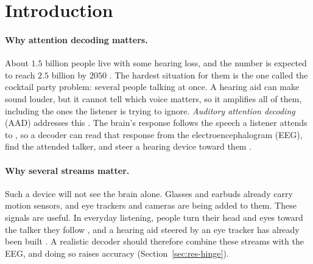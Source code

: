 \section{Introduction}
\label{sec:intro}

\paragraph{Why attention decoding matters.}
About $1.5$ billion people live with some hearing loss, and the number is
expected to reach $2.5$ billion by $2050$ \citep{who2021hearing}. The hardest
situation for them is the one \citet{cherry1953} called the cocktail party
problem: several people talking at once. A hearing aid can make sound louder, but
it cannot tell which voice matters, so it amplifies all of them, including the
ones the listener is trying to ignore. \emph{Auditory attention decoding} (AAD)
addresses this \citep{osullivan2015,geirnaert2021}. The brain's response follows
the speech a listener attends to \citep{ding2012,lalor2009}, so a decoder can
read that response from the electroencephalogram (EEG), find the attended
talker, and steer a hearing device toward them \citep{pan2024neuroheed}.

\paragraph{Why several streams matter.}
Such a device will not see the brain alone. Glasses and earbuds already carry
motion sensors, and eye trackers and cameras are being added to them. These
signals are useful. In everyday listening, people turn their head and eyes toward
the talker they follow \citep{hendrikse2019,best2023gaze,kidd2005}, and a hearing
aid steered by an eye tracker has already been built \citep{kidd2013visually}. A
realistic decoder should therefore combine these streams with the EEG, and doing
so raises accuracy (Section~\ref{sec:res-hinge}).

